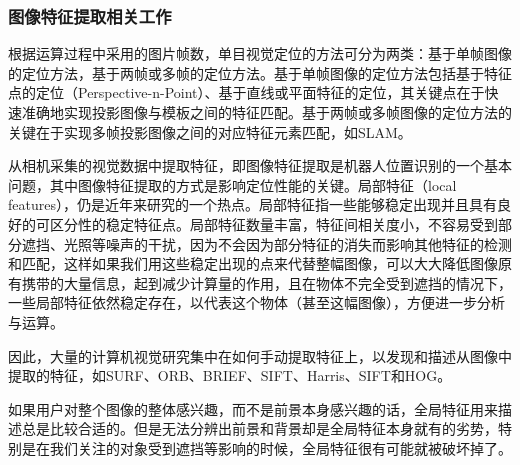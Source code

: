 \subsubsection{图像特征提取相关工作}
根据运算过程中采用的图片帧数，单目视觉定位的方法可分为两类：基于单帧图像的定位方法，基于两帧或多帧的定位方法。基于单帧图像的定位方法包括基于特征点的定位（Perspective-n-Point）、基于直线或平面特征的定位，其关键点在于快速准确地实现投影图像与模板之间的特征匹配。基于两帧或多帧图像的定位方法的关键在于实现多帧投影图像之间的对应特征元素匹配，如SLAM。



从相机采集的视觉数据中提取特征，即图像特征提取是机器人位置识别的一个基本问题，其中图像特征提取的方式是影响定位性能的关键。局部特征（local features），仍是近年来研究的一个热点。局部特征指一些能够稳定出现并且具有良好的可区分性的稳定特征点。局部特征数量丰富，特征间相关度小，不容易受到部分遮挡、光照等噪声的干扰，因为不会因为部分特征的消失而影响其他特征的检测和匹配，这样如果我们用这些稳定出现的点来代替整幅图像，可以大大降低图像原有携带的大量信息，起到减少计算量的作用，且在物体不完全受到遮挡的情况下，一些局部特征依然稳定存在，以代表这个物体（甚至这幅图像），方便进一步分析与运算。

因此，大量的计算机视觉研究集中在如何手动提取特征上，以发现和描述从图像中提取的特征，如SURF\cite{SURF2006surf}、ORB\cite{rublee2011orb}、BRIEF\cite{calonder2010brief}、SIFT\cite{lowe1999object}、Harris\cite{harris1988combined}、SIFT\cite{lowe1999object}和HOG\cite{Dalal2005Histograms}。


如果用户对整个图像的整体感兴趣，而不是前景本身感兴趣的话，全局特征用来描述总是比较合适的。但是无法分辨出前景和背景却是全局特征本身就有的劣势，特别是在我们关注的对象受到遮挡等影响的时候，全局特征很有可能就被破坏掉了。

